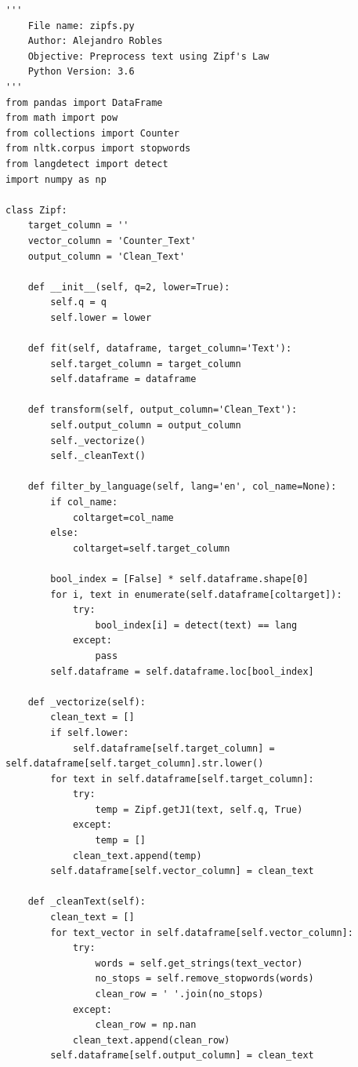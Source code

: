 \documentclass[12pt]{article}
\begin{document}
\newpage
\begin{appendices}
	\centering

\begin{verbatim}
'''
    File name: zipfs.py
    Author: Alejandro Robles
    Objective: Preprocess text using Zipf's Law
    Python Version: 3.6
'''
from pandas import DataFrame
from math import pow
from collections import Counter
from nltk.corpus import stopwords
from langdetect import detect
import numpy as np

class Zipf:
    target_column = ''
    vector_column = 'Counter_Text'
    output_column = 'Clean_Text'

    def __init__(self, q=2, lower=True):
        self.q = q
        self.lower = lower

    def fit(self, dataframe, target_column='Text'):
        self.target_column = target_column
        self.dataframe = dataframe

    def transform(self, output_column='Clean_Text'):
        self.output_column = output_column
        self._vectorize()
        self._cleanText()

    def filter_by_language(self, lang='en', col_name=None):
        if col_name:
            coltarget=col_name
        else:
            coltarget=self.target_column

        bool_index = [False] * self.dataframe.shape[0]
        for i, text in enumerate(self.dataframe[coltarget]):
            try:
                bool_index[i] = detect(text) == lang
            except:
                pass
        self.dataframe = self.dataframe.loc[bool_index]

    def _vectorize(self):
        clean_text = []
        if self.lower:
            self.dataframe[self.target_column] = self.dataframe[self.target_column].str.lower()
        for text in self.dataframe[self.target_column]:
            try:
                temp = Zipf.getJ1(text, self.q, True)
            except:
                temp = []
            clean_text.append(temp)
        self.dataframe[self.vector_column] = clean_text

    def _cleanText(self):
        clean_text = []
        for text_vector in self.dataframe[self.vector_column]:
            try:
                words = self.get_strings(text_vector)
                no_stops = self.remove_stopwords(words)
                clean_row = ' '.join(no_stops)
            except:
                clean_row = np.nan
            clean_text.append(clean_row)
        self.dataframe[self.output_column] = clean_text


\end{verbatim}
\end{appendices}
\end{document}
